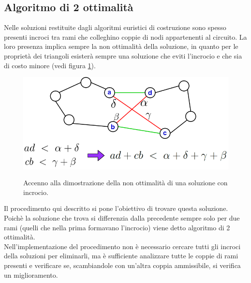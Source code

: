 \subsection{Algoritmo di 2 ottimalità}
Nelle soluzioni restituite dagli algoritmi euristici di costruzione sono spesso presenti incroci tra rami che colleghino coppie di nodi appartenenti al circuito. La loro presenza implica sempre la non ottimalità della soluzione, in quanto per le proprietà dei triangoli esisterà sempre una soluzione che eviti l'incrocio e che sia di costo minore (vedi figura \ref{cross}). 
\begin{figure}[h] 
\begin{center} 
  \includegraphics[scale=0.4]{Images/triangle_property}\\ 
  \caption{\footnotesize{Accenno alla dimostrazione della non ottimalità di una soluzione con incrocio.}}
  \label{cross}
\end{center}
\end{figure}
Il procedimento qui descritto si pone l'obiettivo di trovare questa soluzione. Poichè la soluzione che trova si differenzia dalla precedente sempre solo per due rami (quelli che nella prima formavano l'incrocio) viene detto algoritmo di 2 ottimalità.\\
Nell'implementazione del procedimento non è necessario cercare tutti gli incroci della soluzioni per eliminarli, ma è sufficiente analizzare tutte le coppie di rami presenti e verificare se, scambiandole con un'altra coppia ammissibile, si verifica un miglioramento.

